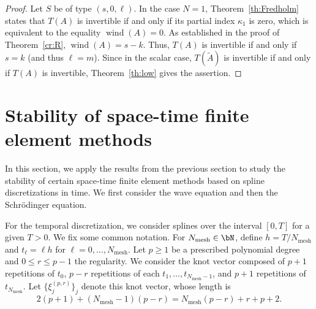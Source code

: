 \documentclass[addpoints,12pt,letter]{article}
\DeclareMathOperator{\wind}{wind}
\DeclareMathOperator{\mesh}{mesh} %
\newcommand{\ka}{\kappa}
\newcommand{\ti}{\tilde}
\newcommand{\SR}{S}
\newcommand{\TF}{T}
\renewcommand{\ge}{\geqslant}
\renewcommand{\le}{\leqslant}
\numberwithin{equation}{section}
\theoremstyle{definition}
\begin{document}
\begin{proof}
Let $\SR$ be of type $(s,0,\ell)$.
In the case $N=1$, Theorem~\ref{th:Fredholm} states that $T(A)$ is invertible if and only if its partial index $\ka_{1}$ is zero, which is equivalent to the equality $\wind(A)=0$.
As established in the proof of Theorem~\ref{cr:R}, $\wind(A)=s-k$.
Thus, $T(A)$ is invertible if and only if $s=k$ (and thus $\ell=m$).
Since in the scalar case, $T(\ti{A})$ is invertible if and only if $T(A)$ is invertible, Theorem~\ref{th:low} gives the assertion.
\end{proof}

\section{Stability of space-time finite element methods}\label{sec:application}

In this section, we apply the results from the previous section to study the stability of certain space-time finite element methods based on spline discretizations in time.
We first consider the wave equation and then the Schrödinger equation.

For the temporal discretization, we consider splines over the interval $[0,\TF]$ for a given $\TF>0$.
We fix some common notation.
For $N_{\mesh}\in\bN$, define $h=\TF /N_{\mesh}$ and $t_{\ell}=\ell h$ for $\ell=0,\ldots,N_{\mesh}$.
Let $p\ge 1$ be a prescribed polynomial degree and $0 \le r \le p-1$ the regularity.
We consider the knot vector composed of $p+1$ repetitions of $t_{0}$, $p-r$ repetitions of each $t_{1},\ldots, t_{N_{\mesh}-1}$, and $p+1$ repetitions of $t_{N_{\mesh}}$.
Let $\{\xi^{(p,r)}_{j}\}_{j}$ denote this knot vector, whose length is
\[
2(p+1)+(N_{\mesh}-1)(p-r)=N_{\mesh}(p-r)+r+p+2.
\]
\end{document}
